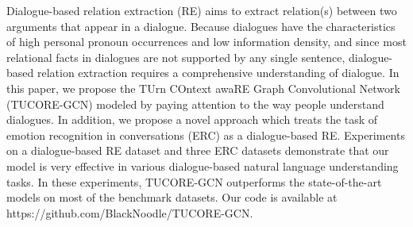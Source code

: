 Dialogue-based relation extraction (RE) aims to extract relation(s) between two arguments that appear in a dialogue. Because dialogues have the characteristics of high personal pronoun occurrences and low information density, and since most relational facts in dialogues are not supported by any single sentence, dialogue-based relation extraction requires a comprehensive understanding of dialogue. In this paper, we propose the TUrn COntext awaRE Graph Convolutional Network (TUCORE-GCN) modeled by paying attention to the way people understand dialogues. In addition, we propose a novel approach which treats the task of emotion recognition in conversations (ERC) as a dialogue-based RE. Experiments on a dialogue-based RE dataset and three ERC datasets demonstrate that our model is very effective in various dialogue-based natural language understanding tasks. In these experiments, TUCORE-GCN outperforms the state-of-the-art models on most of the benchmark datasets. Our code is available at https://github.com/BlackNoodle/TUCORE-GCN.
